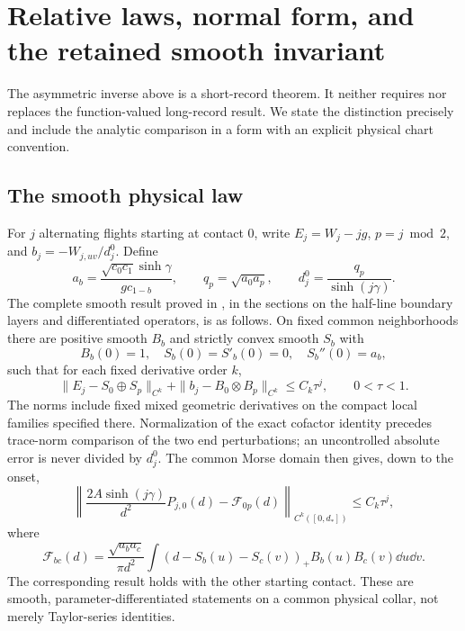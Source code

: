 \section{Relative laws, normal form, and the retained smooth invariant}
\label{sec:relative}
The asymmetric inverse above is a short-record theorem. It neither
requires nor replaces the function-valued long-record result. We state
the distinction precisely and include the analytic comparison in a
form with an explicit physical chart convention.

\subsection{The smooth physical law}
For $j$ alternating flights starting at contact $0$, write
$E_j=W_j-jg$, $p=j\bmod2$, and
$b_j=-W_{j,uv}/d_j^0$. Define
\[
 a_b=\frac{\sqrt{c_0c_1}\sinh\gamma}{gc_{1-b}},\qquad
 q_p=\sqrt{a_0a_p},\qquad d_j^0=\frac{q_p}{\sinh(j\gamma)}.
\]
The complete smooth result proved in \cite{Companion}, in the sections
on the half-line boundary layers and differentiated operators, is as
follows. On fixed common neighborhoods there are positive smooth $B_b$
and strictly convex smooth $S_b$ with
\[
 B_b(0)=1,\quad S_b(0)=S'_b(0)=0,\quad S_b''(0)=a_b,
\]
such that for each fixed derivative order $k$,
\begin{equation}\label{eq:smoothrelative}
 \|E_j-S_0\oplus S_p\|_{C^k}
       +\|b_j-B_0\otimes B_p\|_{C^k}\le C_k\tau^j,
                    \qquad 0<\tau<1.
\end{equation}
The norms include fixed mixed geometric derivatives on the compact
local families specified there. Normalization of the exact cofactor
identity precedes trace-norm comparison of the two end perturbations;
an uncontrolled absolute error is never divided by $d_j^0$.
The common Morse domain then gives, down to the onset,
\begin{equation}\label{eq:integratedrelative}
 \left\|\frac{2A\sinh(j\gamma)}{d^2}P_{j,0}(d)
       -\mathcal F_{0p}(d)\right\|_{C^k([0,d_*])}
                              \le C_k\tau^j,
\end{equation}
where
\begin{equation}\label{eq:limitlaw}
 \mathcal F_{bc}(d)=\frac{\sqrt{a_ba_c}}{\pi d^2}
       \int(d-S_b(u)-S_c(v))_+B_b(u)B_c(v)\dd u\dd v.
\end{equation}
The corresponding result holds with the other starting contact.
These are smooth, parameter-differentiated statements on a common
physical collar, not merely Taylor-series identities.

